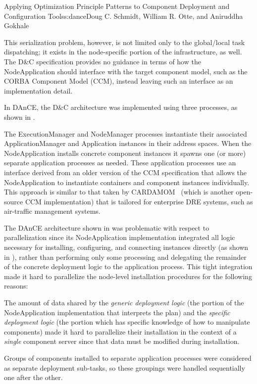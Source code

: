\begin{aosachapter}{Applying Optimization Principle Patterns to Component Deployment and
                    Configuration Tools}{s:dance}{Doug C. Schmidt, William R. Otte, and Aniruddha Gokhale}

This serialization problem, however, is not limited only to the
global/local task dispatching; it exists in the node-specific portion of
the infrastructure, as well. The D\&C specification provides no guidance
in terms of how the NodeApplication should interface with the target
component model, such as the CORBA Component Model (CCM), instead
leaving such an interface as an implementation detail.

In DAnCE, the D\&C architecture was implemented using three processes,
as shown in .

The ExecutionManager and NodeManager processes instantiate their
associated ApplicationManager and Application instances in their address
spaces. When the NodeApplication installs concrete component instances
it spawns one (or more) separate application processes as needed. These
application processes use an interface derived from an older version of
the CCM specification that allows the NodeApplication to instantiate
containers and component instances individually. This approach is
similar to that taken by CARDAMOM~\cite{CARDAMOM:web} (which is another
open-source CCM implementation) that is tailored for enterprise DRE
systems, such as air-traffic management systems.


The DAnCE architecture shown in  was
problematic with respect to parallelization since its NodeApplication
implementation integrated all logic necessary for installing,
configuring, and connecting instances directly (as shown in
),
rather than performing only some processing and delegating the remainder
of the concrete deployment logic to the application process. This tight
integration made it hard to parallelize the node-level installation
procedures for the following reasons:

\begin{aosaitemize}
\item
  The amount of data shared by the \emph{generic deployment logic} (the
  portion of the NodeApplication implementation that interprets the
  plan) and the \emph{specific deployment logic} (the portion which has
  specific knowledge of how to manipulate components) made it hard to
  parallelize their installation in the context of a \emph{single}
  component server since that data must be modified during installation.
\item
  Groups of components installed to separate application processes were
  considered as separate deployment sub-tasks, so these groupings were
  handled sequentially one after the other.
\end{aosaitemize}


\end{aosachapter}
